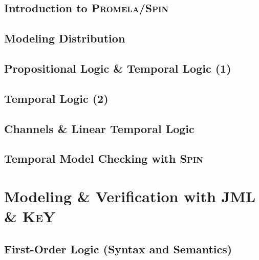\documentclass[12pt,accentcolor=tud1b,bibtotoc,colorback,linedtoc,liststotoc,bigchapter,noresetcounter]{tudreport}
\newcommand{\capitals}[1]{\textsc{#1}}
\begin{document}
\newpage

\section{Introduction to \capitals{Promela/Spin}}

\newpage

\section{Modeling Distribution}

\newpage

\section{Propositional Logic \& Temporal Logic (1)}

\newpage

\section{Temporal Logic (2)}

\newpage

\section{Channels \& Linear Temporal Logic}

\newpage

\section{Temporal Model Checking with \capitals{Spin}}

\newpage



\chapter{Modeling \& Verification with JML \& \capitals{KeY}}


\section{First-Order Logic (Syntax and Semantics)}
\end{document}
